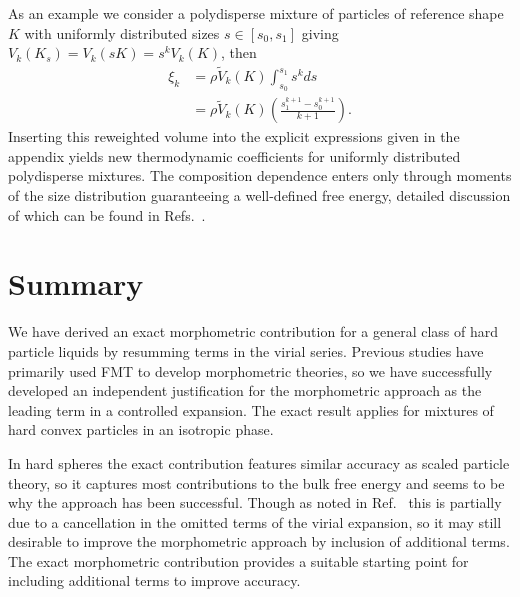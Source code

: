 \documentclass[11pt,twoside]{report}
\begin{document}
As an example we consider a polydisperse mixture of particles of reference shape $K$ with uniformly distributed sizes $s \in [s_0, s_1]$ giving $V_k(K_s) = V_k(s K) = s^k V_k(K)$, then
\begin{equation}
  \begin{split}
    \xi_k
    &=
    \rho \widetilde{V}_k(K) \int_{s_0}^{s_1} s^k ds
    \\ &=
    \rho \widetilde{V}_k(K) \left(\frac{s_1^{k+1} - s_0^{k+1}}{k+1}\right).
  \end{split}
\end{equation}
Inserting this reweighted volume into the explicit expressions given in the appendix yields new thermodynamic coefficients for uniformly distributed polydisperse mixtures.
The composition dependence enters only through moments of the size distribution guaranteeing a well-defined free energy, detailed discussion of which can be found in Refs.\ \cite{GualtieriJCP1982,WarrenPRL1998,SollichPRL1998,SollichAiCP2001}.

\section{Summary}

We have derived an exact morphometric contribution for a general class of hard particle liquids by resumming terms in the virial series.
Previous studies have primarily used FMT to develop morphometric theories, so we have successfully developed an independent justification for the morphometric approach as the leading term in a controlled expansion.
The exact result applies for mixtures of hard convex particles in an isotropic phase.


In hard spheres the exact contribution features similar accuracy as scaled particle theory, so it captures most contributions to the bulk free energy and seems to be why the approach has been successful.
Though as noted in Ref.\ \cite{MarechalPRE2014} this is partially due to a cancellation in the omitted terms of the virial expansion, so it may still desirable to improve the morphometric approach by inclusion of additional terms.
The exact morphometric contribution provides a suitable starting point for including additional terms to improve accuracy.
\end{document}
